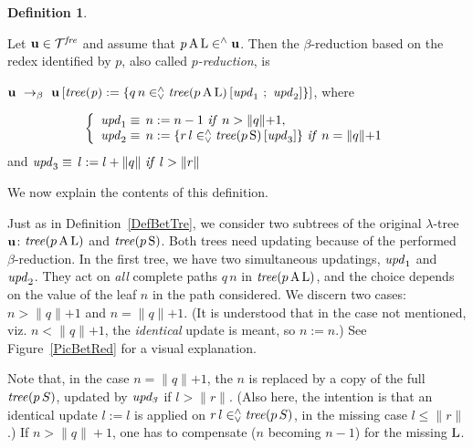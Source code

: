 \documentclass{article}
\theoremstyle{plain}
\theoremstyle{definition}
\newtheorem{Def}[The]{Definition}
\begin{document}
\begin{Def}\label{DefBetFre}

Let ${\bf u} \in {\cal T}^{\it fre}$ and assume that $p \, {\rm A} \, {\rm L} \in^\wedge {\bf u}$.
Then the $\beta$-reduction based on the redex identified by $p$, also called {\em $p$-reduction\/}, is

\smallskip

 ${\bf u} ~\rightarrow_{\beta}~ {\bf u} \, [{\it tree(p)} := \{q \, n \in^\wedge_\vee {\it tree}(p \, {\rm A} \, {\rm L}) \,[{\it upd}_1 ~;~ {\it upd\/}_2] \}]$, where


\[ \left\{ \begin{array}{l}
{\it upd\/}_1 \equiv \, n := n - 1~{\it if\/}~n > \lVert q \lVert + 1, \\

{\it upd\/}_2 \equiv \, n := \{r \, l \in^\wedge_\vee {\it tree}(p \, {\rm S}) \, [{\it upd\/}_3] \} ~{\it if\/}~ n =  \lVert q \lVert  + 1
\end{array}
\right. \]
\hspace{3cm} and ${\it upd\/}_3 \equiv \, l := l +  \lVert q \lVert ~{\it if\/}~l >  \lVert r \lVert $

\end{Def}

We now explain the contents of this definition.

\smallskip

Just as in Definition~\ref{DefBetTre}, we consider two subtrees of the original $\lambda$-tree ${\bf u}$: ${\it tree\/}(p \, {\rm A} \, {\rm L})$ and ${\it tree\/}(p \, {\rm S})$. Both trees need updating because of the performed $\beta$-reduction. In the first tree, we have two simultaneous updatings, ${\it upd}_1$ and ${\it upd}_2$. They act on {\it all\/} complete paths $q \, n$ in ${\it tree\/}(p \, {\rm A} \, {\rm L})$, and the choice depends on the value of the leaf $n$ in the path considered. We discern two cases: $n > \lVert q \lVert  + 1$ and $n =  \lVert q \lVert  + 1$. (It is understood that in the case not mentioned, viz. $n <  \lVert q \lVert  + 1$, the {\it identical\/} update is meant, so $n := n$.) See Figure~\ref{PicBetRed} for a visual explanation.

Note that, in the case $n =  \lVert q \lVert  + 1$, the $n$ is replaced by a copy of the full ${\it tree}(p \, S)$, updated by ${\it upd_3\/}$ if $l >  \lVert r \lVert $. (Also here, the intention is that an identical update $l := l$ is applied on $r \, l \in^\wedge_\vee {\it tree}(p \, S)$,  in the missing case $l \leq  \lVert r \lVert $.)
If $n > \lVert q \rVert + 1$, one has to compensate ($n$ becoming $n-1$) for the missing ${\rm L}$.
\end{document}
